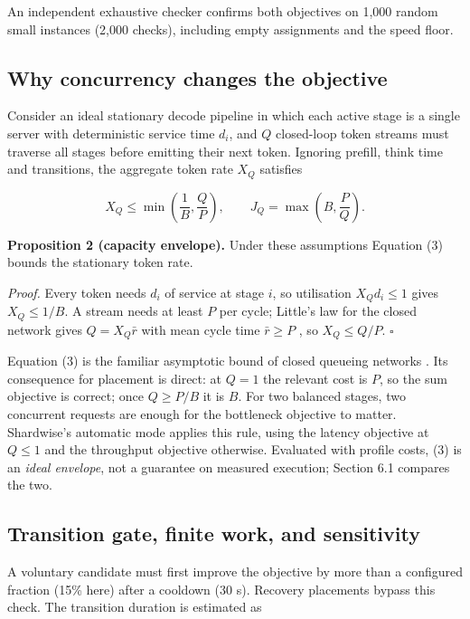 \documentclass[preprint,12pt]{elsarticle}
\begin{document}
An independent exhaustive checker confirms both objectives on 1,000
random small instances (2,000 checks), including empty assignments and
the speed floor.

\hypertarget{why-concurrency-changes-the-objective}{%
\subsection{Why concurrency changes the
objective}\label{why-concurrency-changes-the-objective}}

Consider an ideal stationary decode pipeline in which each active stage
is a single server with deterministic service time \(d_i\), and \(Q\)
closed-loop token streams must traverse all stages before emitting their
next token. Ignoring prefill, think time and transitions, the aggregate
token rate \(X_Q\) satisfies

\[X_Q\le\min\left(\frac{1}{B},\frac{Q}{P}\right),\qquad
 J_Q=\max\left(B,\frac{P}{Q}\right). \tag{3}\]

\textbf{Proposition 2 (capacity envelope).} Under these assumptions
Equation (3) bounds the stationary token rate.

\emph{Proof.} Every token needs \(d_i\) of service at stage \(i\), so
utilisation \(X_Qd_i\le1\) gives \(X_Q\le1/B\). A stream needs at least
\(P\) per cycle; Little's law for the closed network gives
\(Q=X_Q\bar r\) with mean cycle time \(\bar r\ge P\)
\citep{little1961proof}, so \(X_Q\le Q/P\). \(\square\)

Equation (3) is the familiar asymptotic bound of closed queueing
networks \citep{reiser1980mva}. Its consequence for placement is direct:
at \(Q=1\) the relevant cost is \(P\), so the sum objective is correct;
once \(Q\ge P/B\) it is \(B\). For two balanced stages, two concurrent
requests are enough for the bottleneck objective to matter. Shardwise's
automatic mode applies this rule, using the latency objective at
\(Q\le1\) and the throughput objective otherwise. Evaluated with profile
costs, (3) is an \emph{ideal envelope}, not a guarantee on measured
execution; Section 6.1 compares the two.

\hypertarget{transition-gate-finite-work-and-sensitivity}{%
\subsection{Transition gate, finite work, and
sensitivity}\label{transition-gate-finite-work-and-sensitivity}}

A voluntary candidate must first improve the objective by more than a
configured fraction (15\% here) after a cooldown (30 s). Recovery
placements bypass this check. The transition duration is estimated as
\end{document}

